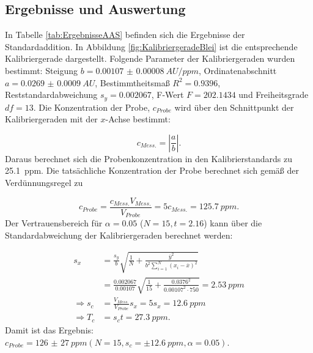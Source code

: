 \subsection{Ergebnisse und Auswertung} \label{sec:ErgebnisseAAS}
  
  In Tabelle \ref{tab:ErgebnisseAAS} befinden sich die Ergebnisse der Standardaddition. In Abbildung \ref{fig:KalibriergeradeBlei} ist die entsprechende Kalibriergerade dargestellt. Folgende Parameter der Kalibriergeraden wurden bestimmt: Steigung $b = \SI[mode=text,separate-uncertainty]{0.00107(8)}{AU\per ppm}$, Ordinatenabschnitt $a = \SI[mode=text, separate-uncertainty]{0.0269(9)}{AU}$, Bestimmtheitsmaß $R^2 = 0.9396$, Reststandardabweichung $s_y = 0.002067$, F-Wert $F = 202.1434$ und Freiheitsgrade $df = 13$. Die Konzentration der Probe, $c_{Probe}$ wird über den Schnittpunkt der Kalibriergeraden mit der $x$-Achse bestimmt:
  
    \begin{equation}
      c_{Mess.} = |\frac{a}{b}|.
    \end{equation}
  Daraus berechnet sich die Probenkonzentration in den Kalibrierstandards zu \SI[mode=text]{25.1}{ppm}. Die tatsächliche Konzentration der Probe berechnet sich gemäß der Verdünnungsregel zu
  
    \begin{equation}
      c_{Probe} = \frac{c_{Mess.} V_{Mess.}}{V_{Probe}} = 5 c_{Mess.} = \SI[mode=text]{125.7}{ppm}.
    \end{equation}
  Der Vertrauensbereich für $\alpha = 0.05$ ($N = 15, t = 2.16$) kann über die Standardabweichung der Kalibriergeraden berechnet werden:
  
    \begin{equation}
      \begin{split}
        s_x &= \frac{s_y}{b} \sqrt{\frac{1}{N} + \frac{\overline{y}^2}{b^2 \sum_{i=1}^N \left(x_i - \overline{x}\right)^2}} \\
            &= \frac{0.002067}{0.00107} \sqrt{\frac{1}{15} + \frac{0.0376^2}{0.00107^2 \cdot 750}} = \SI[mode=text]{2.53}{ppm} \\
   \Rightarrow s_c &= \frac{V_{Mess.}}{V_{Probe}} s_x = 5 s_x = \SI[mode=text]{12.6}{ppm} \\
   \Rightarrow T_c &= s_c t = \SI[mode=text]{27.3}{ppm}.
      \end{split}
    \end{equation}
  Damit ist das Ergebnis: $c_{Probe} = \SI[mode=text, multi-part-units = brackets, separate-uncertainty]{126(27)}{ppm} \left(N = 15, s_c = \pm \SI[mode=text]{12.6}{ppm}, \alpha = 0.05\right)$.
  
